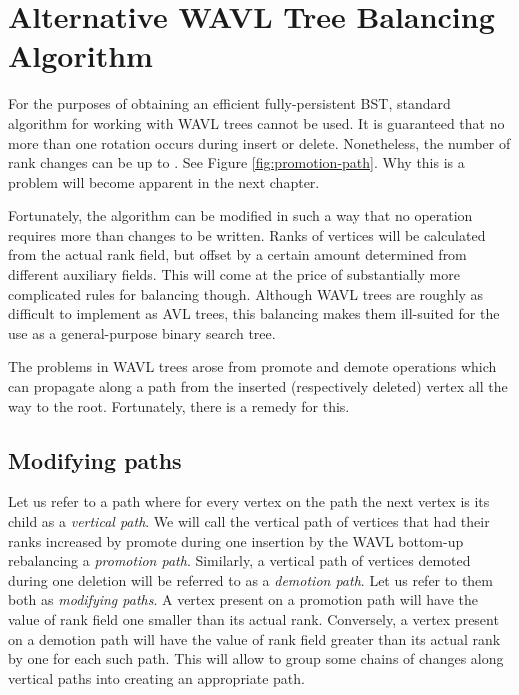 \chapter{Alternative WAVL Tree Balancing Algorithm}

For the purposes of obtaining an efficient fully-persistent BST, standard algorithm for working with WAVL trees cannot be used. 
It is guaranteed that no more than one rotation occurs during insert or delete. 
Nonetheless, the number of rank changes can be up to . See Figure \ref{fig:promotion-path}.
Why this is a problem will become apparent in the next chapter.



Fortunately, the algorithm can be modified in such a way that no operation requires more than  changes to be written. 
Ranks of vertices will be calculated from the actual rank field, but offset by a certain amount determined from different auxiliary fields. 
This will come at the price of substantially more complicated rules for balancing though. 
Although WAVL trees are roughly as difficult to implement as AVL trees, this balancing makes them ill-suited for the use as a general-purpose binary search tree. 

The problems in WAVL trees arose from promote and demote operations which can propagate along a path from the inserted (respectively deleted) vertex all the way to the root. 
Fortunately, there is a remedy for this. 

\section{Modifying paths}

Let us refer to a path where for every vertex on the path the next vertex is its child as a {\em vertical path}.
We will call the vertical path of vertices that had their ranks increased by promote during one insertion by the WAVL bottom-up rebalancing a {\em promotion path}. 
Similarly, a vertical path of vertices demoted during one deletion will be referred to as a {\em demotion path}.
Let us refer to them both as {\em modifying paths}.
A vertex present on a promotion path will have the value of rank field one smaller than its actual rank. 
Conversely, a vertex present on a demotion path will have the value of rank field greater than its actual rank by one for each such path. 
This will allow to group some chains of changes along vertical paths into creating an appropriate path.

